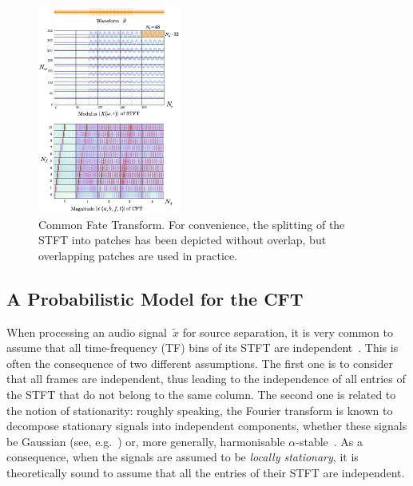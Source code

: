 \begin{figure}[t]
\centering
\includegraphics[width=0.9\columnwidth]{figures/CFT}

\caption{Common Fate Transform. For convenience, the splitting of the STFT
into patches has been depicted without overlap, but overlapping patches
are used in practice\label{fig:CFT}.}
\end{figure}

\subsection{A Probabilistic Model for the CFT}

\label{sub:separation}

When processing an audio signal~$\tilde{x}$ for source separation,
it is very common to assume that all time-frequency (TF) bins
of its STFT are independent~\cite{techreport_NMF,duong_TSALP2010,ozerov2012general,GP-USS-TSP}.
This is often the consequence of two different assumptions.
The first one is to consider that all frames are independent, thus
leading to the independence of all entries of the STFT that do not belong to the
same column. The second one is related to the notion of stationarity:
roughly speaking, the Fourier transform is known to decompose stationary
signals into independent components, whether these signals be Gaussian
(see, e.g.~\cite{GP-USS-TSP}) or, more generally, harmonisable $\alpha$-stable~\cite{alpha-wiener}.
As a consequence, when the signals are assumed to be \emph{locally stationary},
it is theoretically sound to assume that all the entries of
their STFT are independent.

